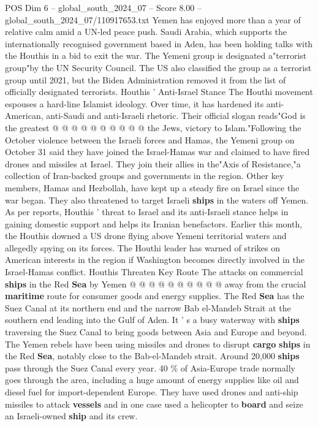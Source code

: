 \begin{textsample}{POS Dim 6 – global\_south\_2024\_07 – Score 8.00 – global\_south\_2024\_07/110917653.txt}
Yemen has enjoyed more than a year of relative calm amid a UN-led peace push.
Saudi Arabia, which supports the internationally recognised government based in Aden, has been holding talks with the Houthis in a bid to exit the war.
The Yemeni group is designated a"terrorist group"by the UN Security Council.
The US also classified the group as a terrorist group until 2021, but the Biden Administration removed it from the list of officially designated terrorists.
Houthis ' Anti-Israel Stance The Houthi movement espouses a hard-line Islamist ideology.
Over time, it has hardened its anti-American, anti-Saudi and anti-Israeli rhetoric.
Their official slogan reads"God is the greatest @ @ @ @ @ @ @ @ @ @ the Jews, victory to Islam."Following the October violence between the Israeli forces and Hamas, the Yemeni group on October 31 said they have joined the Israel-Hamas war and claimed to have fired drones and missiles at Israel.
They join their allies in the"Axis of Resistance,"a collection of Iran-backed groups and governments in the region.
Other key members, Hamas and Hezbollah, have kept up a steady fire on Israel since the war began.
They also threatened to target Israeli \textbf{ships} in the waters off Yemen.
As per reports, Houthis ' threat to Israel and its anti-Israeli stance helps in gaining domestic support and helps its Iranian benefactors.
Earlier this month, the Houthis downed a US drone flying above Yemeni territorial waters and allegedly spying on its forces.
The Houthi leader has warned of strikes on American interests in the region if Washington becomes directly involved in the Israel-Hamas conflict.
Houthis Threaten Key Route The attacks on commercial \textbf{ships} in the Red \textbf{Sea} by Yemen @ @ @ @ @ @ @ @ @ @ away from the crucial \textbf{maritime} route for consumer goods and energy supplies.
The Red \textbf{Sea} has the Suez Canal at its northern end and the narrow Bab el-Mandeb Strait at the southern end leading into the Gulf of Aden.
It ' s a busy waterway with \textbf{ships} traversing the Suez Canal to bring goods between Asia and Europe and beyond.
The Yemen rebels have been using missiles and drones to disrupt \textbf{cargo} \textbf{ships} in the Red \textbf{Sea}, notably close to the Bab-el-Mandeb strait.
Around 20,000 \textbf{ships} pass through the Suez Canal every year. 40 \% of Asia-Europe trade normally goes through the area, including a huge amount of energy supplies like oil and diesel fuel for import-dependent Europe.
They have used drones and anti-ship missiles to attack \textbf{vessels} and in one case used a helicopter to \textbf{board} and seize an Israeli-owned \textbf{ship} and its crew.

\end{textsample}
